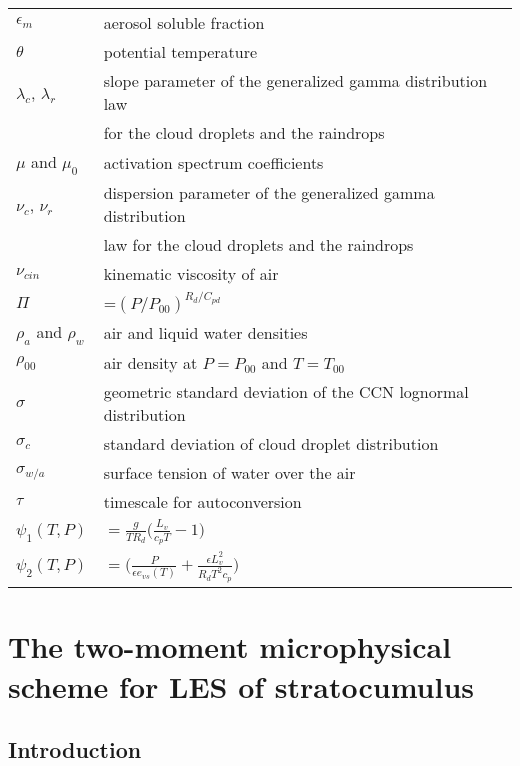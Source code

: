 \begin{longtable}{ll}
$\epsilon_m$&aerosol soluble fraction\\
$\theta$&potential temperature\\
$\lambda_c$, $\lambda_r$&slope parameter of the generalized gamma distribution law\\
                        &for the cloud droplets and the raindrops\\
$\mu$ and ${\mu}_0$&activation spectrum coefficients\\
$\nu_c$, $\nu_r$&dispersion parameter of the generalized gamma distribution\\
                &law for the cloud droplets and the raindrops\\
$\nu_{cin}$&kinematic viscosity of air\\
$\Pi$&=$(P/P_{00})^{R_d/C_{pd}}$\\
$\rho_a$ and $\rho_w$&air and liquid water densities\\
$\rho_{00}$&air density at $P=P_{00}$ and $T=T_{00}$\\
$\sigma$&geometric standard deviation of the CCN lognormal distribution\\
$\sigma_c$&standard deviation of cloud droplet distribution\\
$\sigma_{w/a}$&surface tension of water over the air\\
$\tau$&timescale for autoconversion\\
$\psi_1(T,P)$&$=\displaystyle{\frac{g}{TR_d}}\displaystyle{\Big(\frac{L_v}{c_pT}-1
\Big)}$ \\
$\psi_2(T,P)$&$=\displaystyle{\Big(\frac{P}{\epsilon e_{vs}(T)}+
\frac{\epsilon L_v^2} {R_dT^2c_p}} \Big)$\\
\end{longtable}

%
\section{The two-moment microphysical scheme for LES of stratocumulus}\label{KHKO}
\subsection{Introduction}
%

